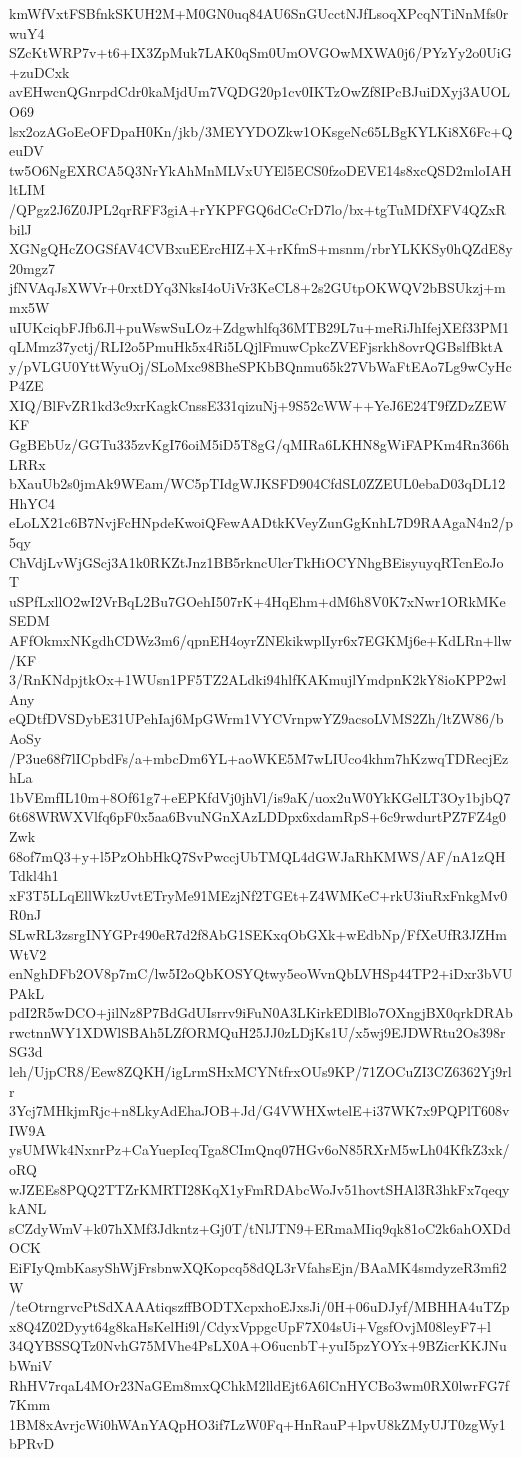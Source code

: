 kmWfVxtFSBfnkSKUH2M+M0GN0uq84AU6SnGUcctNJfLsoqXPcqNTiNnMfs0rwuY4
SZcKtWRP7v+t6+IX3ZpMuk7LAK0qSm0UmOVGOwMXWA0j6/PYzYy2o0UiG+zuDCxk
avEHwcnQGnrpdCdr0kaMjdUm7VQDG20p1cv0IKTzOwZf8IPcBJuiDXyj3AUOLO69
lsx2ozAGoEeOFDpaH0Kn/jkb/3MEYYDOZkw1OKsgeNc65LBgKYLKi8X6Fc+QeuDV
tw5O6NgEXRCA5Q3NrYkAhMnMLVxUYEl5ECS0fzoDEVE14s8xcQSD2mloIAHltLIM
/QPgz2J6Z0JPL2qrRFF3giA+rYKPFGQ6dCcCrD7lo/bx+tgTuMDfXFV4QZxRbilJ
XGNgQHcZOGSfAV4CVBxuEErcHIZ+X+rKfmS+msnm/rbrYLKKSy0hQZdE8y20mgz7
jfNVAqJsXWVr+0rxtDYq3NksI4oUiVr3KeCL8+2s2GUtpOKWQV2bBSUkzj+mmx5W
uIUKciqbFJfb6Jl+puWswSuLOz+Zdgwhlfq36MTB29L7u+meRiJhIfejXEf33PM1
qLMmz37yctj/RLI2o5PmuHk5x4Ri5LQjlFmuwCpkcZVEFjsrkh8ovrQGBslfBktA
y/pVLGU0YttWyuOj/SLoMxc98BheSPKbBQnmu65k27VbWaFtEAo7Lg9wCyHcP4ZE
XIQ/BlFvZR1kd3c9xrKagkCnssE331qizuNj+9S52cWW++YeJ6E24T9fZDzZEWKF
GgBEbUz/GGTu335zvKgI76oiM5iD5T8gG/qMIRa6LKHN8gWiFAPKm4Rn366hLRRx
bXauUb2s0jmAk9WEam/WC5pTIdgWJKSFD904CfdSL0ZZEUL0ebaD03qDL12HhYC4
eLoLX21c6B7NvjFcHNpdeKwoiQFewAADtkKVeyZunGgKnhL7D9RAAgaN4n2/p5qy
ChVdjLvWjGScj3A1k0RKZtJnz1BB5rkncUlcrTkHiOCYNhgBEisyuyqRTcnEoJoT
uSPfLxllO2wI2VrBqL2Bu7GOehI507rK+4HqEhm+dM6h8V0K7xNwr1ORkMKeSEDM
AFfOkmxNKgdhCDWz3m6/qpnEH4oyrZNEkikwplIyr6x7EGKMj6e+KdLRn+llw/KF
3/RnKNdpjtkOx+1WUsn1PF5TZ2ALdki94hlfKAKmujlYmdpnK2kY8ioKPP2wlAny
eQDtfDVSDybE31UPehIaj6MpGWrm1VYCVrnpwYZ9acsoLVMS2Zh/ltZW86/bAoSy
/P3ue68f7lICpbdFs/a+mbcDm6YL+aoWKE5M7wLIUco4khm7hKzwqTDRecjEzhLa
1bVEmfIL10m+8Of61g7+eEPKfdVj0jhVl/is9aK/uox2uW0YkKGelLT3Oy1bjbQ7
6t68WRWXVlfq6pF0x5aa6BvuNGnXAzLDDpx6xdamRpS+6c9rwdurtPZ7FZ4g0Zwk
68of7mQ3+y+l5PzOhbHkQ7SvPwccjUbTMQL4dGWJaRhKMWS/AF/nA1zQHTdkl4h1
xF3T5LLqEllWkzUvtETryMe91MEzjNf2TGEt+Z4WMKeC+rkU3iuRxFnkgMv0R0nJ
SLwRL3zsrgINYGPr490eR7d2f8AbG1SEKxqObGXk+wEdbNp/FfXeUfR3JZHmWtV2
enNghDFb2OV8p7mC/lw5I2oQbKOSYQtwy5eoWvnQbLVHSp44TP2+iDxr3bVUPAkL
pdI2R5wDCO+jilNz8P7BdGdUIsrrv9iFuN0A3LKirkEDlBlo7OXngjBX0qrkDRAb
rwctnnWY1XDWlSBAh5LZfORMQuH25JJ0zLDjKs1U/x5wj9EJDWRtu2Os398rSG3d
leh/UjpCR8/Eew8ZQKH/igLrmSHxMCYNtfrxOUs9KP/71ZOCuZI3CZ6362Yj9rlr
3Ycj7MHkjmRjc+n8LkyAdEhaJOB+Jd/G4VWHXwtelE+i37WK7x9PQPlT608vIW9A
ysUMWk4NxnrPz+CaYuepIcqTga8CImQnq07HGv6oN85RXrM5wLh04KfkZ3xk/oRQ
wJZEEs8PQQ2TTZrKMRTI28KqX1yFmRDAbcWoJv51hovtSHAl3R3hkFx7qeqykANL
sCZdyWmV+k07hXMf3Jdkntz+Gj0T/tNlJTN9+ERmaMIiq9qk81oC2k6ahOXDdOCK
EiFIyQmbKasyShWjFrsbnwXQKopcq58dQL3rVfahsEjn/BAaMK4smdyzeR3mfi2W
/teOtrngrvcPtSdXAAAtiqszffBODTXcpxhoEJxsJi/0H+06uDJyf/MBHHA4uTZp
x8Q4Z02Dyyt64g8kaHsKelHi9l/CdyxVppgcUpF7X04sUi+VgsfOvjM08leyF7+l
34QYBSSQTz0NvhG75MVhe4PsLX0A+O6ucnbT+yuI5pzYOYx+9BZicrKKJNubWniV
RhHV7rqaL4MOr23NaGEm8mxQChkM2lldEjt6A6lCnHYCBo3wm0RX0lwrFG7f7Kmm
1BM8xAvrjcWi0hWAnYAQpHO3if7LzW0Fq+HnRauP+lpvU8kZMyUJT0zgWy1bPRvD
